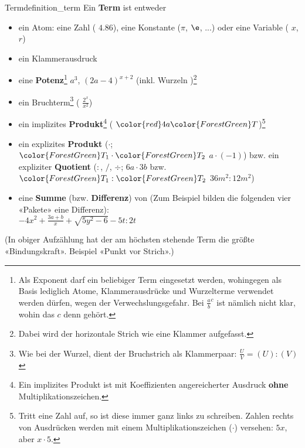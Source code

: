 \begin{definition}{Term}{definition_term}
  Ein \textbf{Term} ist entweder
  \begin{itemize}
  \item ein Atom: eine Zahl (\zB{} $4.86$), eine Konstante
    ($\pi$, $\e$, ...) oder  eine Variable (\zB{}   $x$, $r$)
  \item ein Klammerausdruck  
   \item eine \textbf{Potenz}\footnote{Als Exponent darf
     ein beliebiger Term eingesetzt werden, wohingegen als Basis
     lediglich Atome, Klammerausdrücke und Wurzelterme verwendet
     werden dürfen, wegen der Verwechslungsgefahr. Bei
     ${\frac{a}{b}}^c$ ist nämlich nicht klar, wohin das $c$ denn
     gehört.}
      \zB{}
     $a^3$, $(2a - 4)^{x+2}$ (inkl.  Wurzeln )\footnote{Dabei wird der
  horizontale Strich wie eine Klammer aufgefasst.}
    \item  ein Bruchterm\footnote{Wie bei der Wurzel, dient der Bruchstrich als Klammerpaar: $\frac{U}{V}=(U):(V)$} ( \zB{} $\frac{2^x}{x^2}$)
    \item ein implizites \textbf{Produkt}\footnote{Ein implizites
      Produkt ist mit Koeffizienten angereicherter Ausdruck
      \textbf{ohne} Multiplikationszeichen.} (\zB{}
      ${\color{red}4a}{\color{ForestGreen}T}$)\footnote{Tritt eine Zahl auf,
      so ist diese immer ganz links zu schreiben. Zahlen rechts von
      Ausdrücken werden mit einem Multiplikationszeichen ($\cdot$) versehen: $5x$, aber $x\cdot{}5$.}
    \item ein explizites \textbf{Produkt} ($\cdot$;  ${\color{ForestGreen}T_1}\cdot {\color{ForestGreen}T_2}$ \zB{} $a\cdot(-1)$) bzw. ein expliziter \textbf{Quotient} ($:$, $/$, $\div$; $6a\cdot3b$ bzw. ${\color{ForestGreen}T_1}:{\color{ForestGreen}T_2}$ \zB{} $36m^2:12m^2$)
  \item eine \textbf{Summe} (bzw. \textbf{Differenz}) von 
  (Zum Beispiel bilden die folgenden
  vier «Pakete» eine Differenz):\\
  $-4x^2 + \frac{3a+b}{x} + \sqrt{5y^2-6} - 5t:2t$

    \end{itemize}
(In obiger Aufzählung hat der am höchsten stehende Term die größte
«Bindungskraft». Beispiel «Punkt vor Strich».)
\end{definition}

